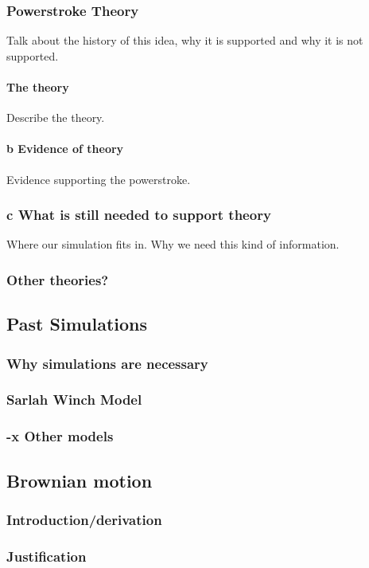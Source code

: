 \documentclass[10pt]{article} %
\begin{document}
\subsubsection{Powerstroke Theory}
Talk about the history of this idea, why it is supported and why it is not supported.\\
\paragraph{The theory}
Describe the theory.
\paragraph{b Evidence of theory}
Evidence supporting the powerstroke.

\subsubsection{c What is still needed to support theory}
Where our simulation fits in. Why we need this kind of information.
\subsubsection{Other theories?}
	\subsection{Past Simulations}
		\subsubsection{Why simulations are necessary}
		\subsubsection{Sarlah Winch Model}
		\subsubsection{-x Other models}
	\subsection{Brownian motion}
                \subsubsection{Introduction/derivation}
                \subsubsection{Justification}
\end{document}
